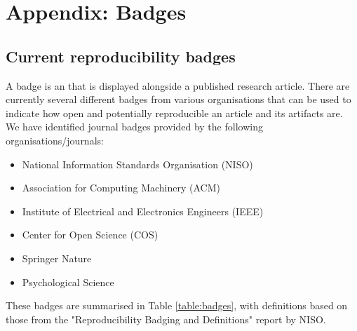 \section{Appendix: Badges}

\subsection{Current reproducibility badges}

A badge is an that is displayed alongside a published research article. There are currently several different badges from various organisations that can be used to indicate how open and potentially reproducible an article and its artifacts are. We have identified journal badges provided by the following organisations/journals:
\begin{itemize}
    \item National Information Standards Organisation (NISO)
    \item Association for Computing Machinery (ACM)
    \item Institute of Electrical and Electronics Engineers (IEEE)
    \item Center for Open Science (COS)
    \item Springer Nature
    \item Psychological Science
\end{itemize}

These badges are summarised in Table \ref{table:badges}, with definitions based on those from the "Reproducibility Badging and Definitions" report by NISO.\autocite{niso_reproducibility_badging_and_definitions_working_group_reproducibility_2021}

